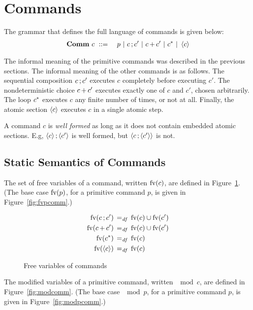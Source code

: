 \documentclass[11pt]{report}
\begin{document}
\section{Commands} %
\label{sec:commands}

The grammar that defines the full language of commands is given below:  
\begin{eqnarray*}
	\mathbf{Comm}~c & ~::=~ & p ~|~ c \operatorname{;} c' ~|~ c \operatorname{+} c' ~|~ c^{\operatorname{\ast}} ~|~ \left\langle c \right\rangle
\end{eqnarray*}

The informal meaning of the primitive commands was described in the previous sections. The informal meaning of the other commands is as follows. The sequential composition $c \operatorname{;} c'$ executes $c$ completely before executing $c'$. The nondeterministic choice $c \operatorname{+} c'$ executes exactly one of $c$ and $c'$, chosen arbitrarily. The loop $c^{\operatorname{\ast}}$ executes $c$ any finite number of times, or not at all. Finally, the atomic section $\left\langle c \right\rangle$ executes $c$ in a single atomic step. 

A command $c$ is \emph{well formed} as long as it does not contain embedded atomic sections. E.g, $\left\langle c \right\rangle \operatorname{;} \left\langle c' \right\rangle$ is well formed, but $\left\langle c \operatorname{;} \left\langle c' \right\rangle \right\rangle$ is not. 

\subsection{Static Semantics of Commands} %
\label{sub:static_semantics}

The set of free variables of a command, written $\mathrm{fv}(c)$, are defined in Figure~\ref{fig:fvcomm}. (The base case $\mathrm{fv}(p)$, for a primitive command $p$, is given in Figure~\ref{fig:fvpcomm}.)

\begin{figure}[h]
	\centering
	\begin{align*}
		\mathrm{fv}(c \operatorname{;} c') \operatorname{\;=_{\mathit{df}}\;} {} & \mathrm{fv}(c) \cup \mathrm{fv}(c') \\ 
		\mathrm{fv}(c \operatorname{+} c') \operatorname{\;=_{\mathit{df}}\;} {} & \mathrm{fv}(c) \cup \mathrm{fv}(c') \\ 
		\mathrm{fv}(c^{\operatorname{\ast}}) \operatorname{\;=_{\mathit{df}}\;} {} & \mathrm{fv}(c) \\ 
		\mathrm{fv}(\left\langle c \right\rangle) \operatorname{\;=_{\mathit{df}}\;} {} & \mathrm{fv}(c) 
 	\end{align*}
	\caption{Free variables of commands}
	\label{fig:fvcomm}
\end{figure}


The modified variables of a primitive command, written $\mod{c}$, are defined in Figure~\ref{fig:modcomm}. (The base case $\mod{p}$, for a primitive command $p$, is given in Figure~\ref{fig:modpcomm}.)
\end{document}
